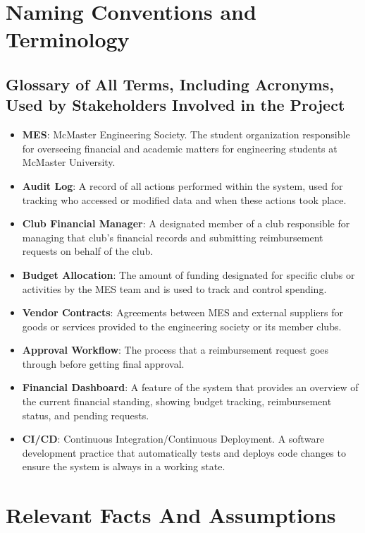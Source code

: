 \documentclass[12pt]{article}
\begin{document}
\section{Naming Conventions and Terminology}
\subsection{Glossary of All Terms, Including Acronyms, Used by Stakeholders Involved in the Project}

\begin{itemize}
    \item \textbf{MES}: McMaster Engineering Society. The student organization responsible for overseeing financial and academic matters for engineering students at McMaster University.    
    \item \textbf{Audit Log}: A record of all actions performed within the system, used for tracking who accessed or modified data and when these actions took place.
    \item \textbf{Club Financial Manager}: A designated member of a club responsible for managing that club's financial records and submitting reimbursement requests on behalf of the club.
    \item \textbf{Budget Allocation}: The amount of funding designated for specific clubs or activities by the MES team and is used to track and control spending.
    \item \textbf{Vendor Contracts}: Agreements between MES and external suppliers for goods or services provided to the engineering society or its member clubs.
    \item \textbf{Approval Workflow}: The process that a reimbursement request goes through before getting final approval.
    \item \textbf{Financial Dashboard}: A feature of the system that provides an overview of the current financial standing, showing budget tracking, reimbursement status, and pending requests.
    \item \textbf{CI/CD}: Continuous Integration/Continuous Deployment. A software development practice that automatically tests and deploys code changes to ensure the system is always in a working state.
\end{itemize}


\section{Relevant Facts And Assumptions}
\end{document}
